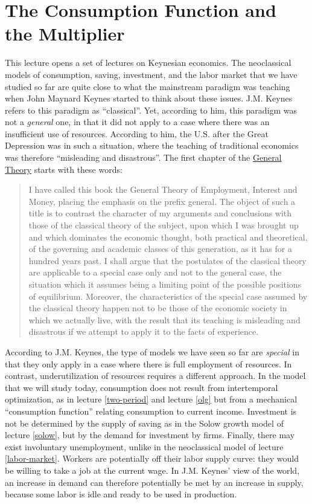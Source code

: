 \documentclass[]{book}
\theoremstyle{definition}
\theoremstyle{definition}
\theoremstyle{definition}
\theoremstyle{remark}
\begin{document}
\hypertarget{cons-function}{\chapter{The Consumption Function and the
Multiplier}\label{cons-function}}

This lecture opens a set of lectures on Keynesian economics. The
neoclassical models of consumption, saving, investment, and the labor
market that we have studied so far are quite close to what the
mainstream paradigm was teaching when John Maynard Keynes started to
think about these issues. J.M. Keynes refers to this paradigm as
``classical''. Yet, according to him, this paradigm was not a
\emph{general} one, in that it did not apply to a case where there was
an insufficient use of resources. According to him, the U.S. after the
Great Depression was in such a situation, where the teaching of
traditional economics was therefore ``misleading and disastrous''. The
first chapter of the
\href{http://cas2.umkc.edu/economics/people/facultypages/kregel/courses/econ645/winter2011/generaltheory.pdf}{General
Theory} starts with these words:

\begin{quote}
I have called this book the General Theory of Employment, Interest and
Money, placing the emphasis on the prefix general. The object of such a
title is to contrast the character of my arguments and conclusions with
those of the classical theory of the subject, upon which I was brought
up and which dominates the economic thought, both practical and
theoretical, of the governing and academic classes of this generation,
as it has for a hundred years past. I shall argue that the postulates of
the classical theory are applicable to a special case only and not to
the general case, the situation which it assumes being a limiting point
of the possible positions of equilibrium. Moreover, the characteristics
of the special case assumed by the classical theory happen not to be
those of the economic society in which we actually live, with the result
that its teaching is misleading and disastrous if we attempt to apply it
to the facts of experience.
\end{quote}

According to J.M. Keynes, the type of models we have seen so far are
\emph{special} in that they only apply in a case where there is full
employment of resources. In contrast, underutilization of resources
requires a different approach. In the model that we will study today,
consumption does not result from intertemporal optimization, as in
lecture \ref{two-period} and lecture \ref{olg} but from a mechanical
``consumption function'' relating consumption to current income.
Investment is not be determined by the supply of saving as in the Solow
growth model of lecture \ref{solow}, but by the demand for investment by
firms. Finally, there may exist involuntary unemployment, unlike in the
neoclassical model of lecture \ref{labor-market}. Workers are
potentially off their labor supply curve: they would be willing to take
a job at the current wage. In J.M. Keynes' view of the world, an
increase in demand can therefore potentially be met by an increase in
supply, because some labor is idle and ready to be used in production.
\end{document}
